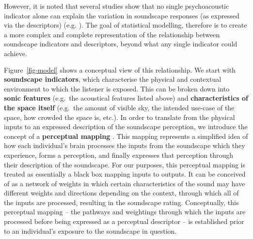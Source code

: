 \documentclass[
  authoryear,
  preprint,
  1p]{elsarticle}
\begin{document}
However, it is noted that several studies show that no single
psychoacoustic indicator alone can explain the variation in soundscape
responses (as expressed via the descriptors) (e.g.
\citep{PerssonWaye2002Psycho}). The goal of statistical modelling,
therefore is to create a more complex and complete representation of the
relationship between soundscape indicators and descriptors, beyond what
any single indicator could achieve.

Figure~\ref{fig-model} shows a conceptual view of this relationship. We
start with \textbf{soundscape indicators}, which characterise the
physical and contextual environment to which the listener is exposed.
This can be broken down into \textbf{sonic features} (e.g.~the
acoustical features listed above) and \textbf{characteristics of the
space itself} (e.g.~the amount of visible sky, the intended use-case of
the space, how crowded the space is, etc.). In order to translate from
the physical inputs to an expressed description of the soundscape
perception, we introduce the concept of a \textbf{perceptual mapping}
\citep{Lionello2021new}. This mapping represents a simplified idea of
how each individual's brain processes the inputs from the soundscape
which they experience, forms a perception, and finally expresses that
perception through their description of the soundscape. For our
purposes, this perceptual mapping is treated as essentially a black box
mapping inputs to outputs. It can be conceived of as a network of
weights in which certain characteristics of the sound may have different
weights and directions depending on the context, through which all of
the inputs are processed, resulting in the soundscape rating.
Conceptually, this perceptual mapping -- the pathways and weightings
through which the inputs are processed before being expressed as a
perceptual descriptor -- is established prior to an individual's
exposure to the soundscape in question.
\end{document}
